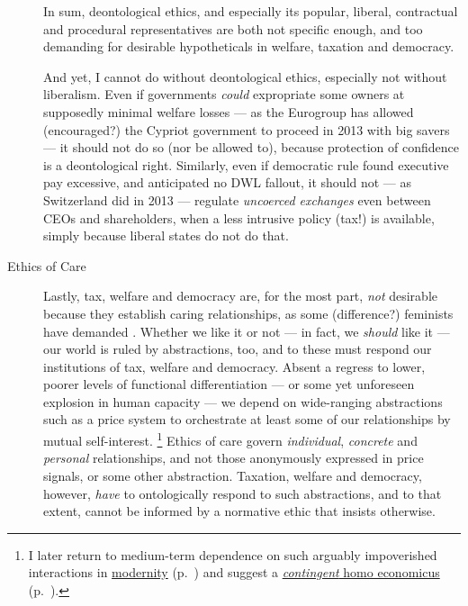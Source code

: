 \begin{description}
	In sum, deontological ethics, and especially its popular, liberal, contractual and procedural representatives are both not specific enough, and too demanding for desirable hypotheticals in welfare, taxation and democracy.

	And yet, I cannot do without deontological ethics, especially not without liberalism.
	Even if governments \emph{could} expropriate some owners at supposedly minimal welfare losses --- as the Eurogroup has allowed (encouraged?) the Cypriot government to proceed in 2013 with big savers --- it should not do so (nor be allowed to), because protection of confidence is a deontological right.
	Similarly, even if democratic rule found executive pay excessive, and anticipated no \gls{DWL} fallout, it should not --- as Switzerland did in 2013 --- regulate \emph{uncoerced exchanges} \citep{Nozick1974} even between CEOs and shareholders, when a less intrusive policy (tax!) is available, simply because liberal states do not do that.

	\item[Ethics of Care]
		\label{itm:ethics-of-care}
	Lastly, tax, welfare and democracy are, for the most part, \emph{not} desirable because they establish caring relationships, as some (difference?) feminists have demanded \citep{Noddings1984,Gilligan1982}.
	Whether we like it or not --- in fact, we \emph{should} like it --- our world is ruled by abstractions, too, and to these must respond our institutions of tax, welfare and democracy.
	Absent a regress to lower, poorer levels of functional differentiation --- or some yet unforeseen explosion in human capacity --- we depend on wide-ranging abstractions such as a price system to orchestrate at least some of our relationships by mutual self-interest.
	\footnote{
		I later return to medium-term dependence on such arguably impoverished interactions in \hyperref[sec:modernity]{modernity} (p.~\pageref{sec:modernity}) and suggest a \hyperref[sec:contingent-homo-economicus]{\emph{contingent} homo economicus} (p.~\pageref{sec:contingent-homo-economicus}).
	}
	Ethics of care govern \emph{individual}, \emph{concrete} and \emph{personal} relationships, and not those anonymously expressed in price signals, or some other abstraction.
	Taxation, welfare and democracy, however, \emph{have} to ontologically respond to such abstractions, and to that extent, cannot be informed by a normative ethic that insists otherwise.


\end{description}
